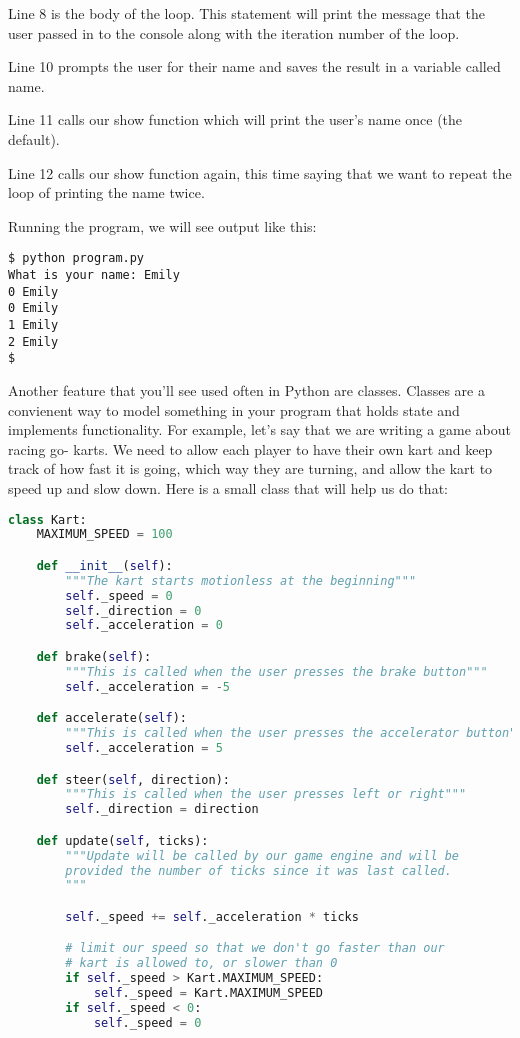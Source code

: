 Line 8 is the body of the loop. This statement will print the message that the user
passed in to the console along with the iteration number of the loop.

Line 10 prompts the user for their name and saves the result in a variable called
name.

Line 11 calls our show function which will print the user's name once (the default).

Line 12 calls our show function again, this time saying that we want to repeat the
loop of printing the name twice.\newline

Running the program, we will see output like this:
\begin{verbatim}
$ python program.py
What is your name: Emily
0 Emily
0 Emily
1 Emily
2 Emily
$
\end{verbatim}

Another feature that you'll see used often in Python are classes. Classes are a
convienent way to model something in your program that holds state and implements
functionality. For example, let's say that we are writing a game about racing go-
karts. We need to allow each player to have their own kart and keep track of how
fast it is going, which way they are turning, and allow the kart to speed up and
slow down. Here is a small class that will help us do that:

\begin{lstlisting}[language=Python,caption=An example of a Python class]
class Kart:
    MAXIMUM_SPEED = 100

    def __init__(self):
        """The kart starts motionless at the beginning"""
        self._speed = 0
        self._direction = 0
        self._acceleration = 0

    def brake(self):
        """This is called when the user presses the brake button"""
        self._acceleration = -5

    def accelerate(self):
        """This is called when the user presses the accelerator button"""
        self._acceleration = 5

    def steer(self, direction):
        """This is called when the user presses left or right"""
        self._direction = direction

    def update(self, ticks):
        """Update will be called by our game engine and will be
        provided the number of ticks since it was last called.
        """

        self._speed += self._acceleration * ticks

        # limit our speed so that we don't go faster than our
        # kart is allowed to, or slower than 0
        if self._speed > Kart.MAXIMUM_SPEED:
            self._speed = Kart.MAXIMUM_SPEED
        if self._speed < 0:
            self._speed = 0
\end{lstlisting}

